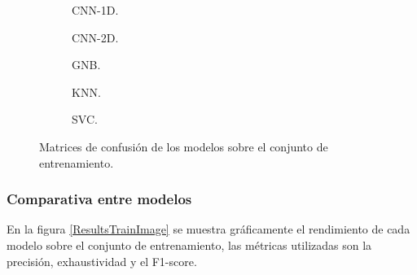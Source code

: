     \begin{figure}[H]
        \centering
        \begin{subfigure}{0.4\textwidth}
            
            \caption{CNN-1D.}
            \label{ConfusionMatrixTrainImages:1D}
        \end{subfigure}
        \hspace{1mm}
        \begin{subfigure}{0.4\textwidth}
            
            \caption{CNN-2D.} 
            \label{ConfusionMatrixTrainImages:2D}
        \end{subfigure}
        \vspace*{0.1 mm}
        \begin{subfigure}{0.4\textwidth}
            
            \caption{GNB.}
            \label{ConfusionMatrixTrainImages:GNB}
        \end{subfigure}
        \hspace{1mm}
        \begin{subfigure}{0.4\textwidth}
            
            \caption{KNN.}
            \label{ConfusionMatrixTrainImages:KNN}
        \end{subfigure}
        \vspace*{0.1 mm}
        \begin{subfigure}{1\textwidth}
            \centering
            
            \caption{SVC.}
            \label{ConfusionMatrixTrainImages:SVC}
        \end{subfigure}
        \caption{Matrices de confusión de los modelos sobre el conjunto de entrenamiento.}
        \label{ConfusionMatrixTrainImages}
     \end{figure}


  \subsubsection{Comparativa entre modelos}

  En la figura \eqref{ResultsTrainImage} se muestra gráficamente el rendimiento de cada modelo sobre el conjunto de entrenamiento, las métricas utilizadas son la precisión, exhaustividad y el F1-score.

